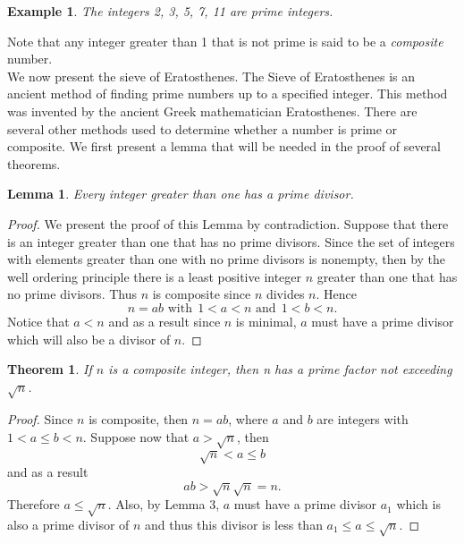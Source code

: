 \documentclass[12pt,letterpaper]{book}
\newtheorem{theorem}{Theorem}
\newtheorem{lemma}{Lemma}
\newtheorem{example}{Example}
\begin{document}
\begin{example}
The integers 2, 3, 5, 7, 11 are prime integers.
\end{example}

Note that any integer greater than 1 that is not prime is said to be a
\textit{composite} number.\\

We now present the sieve of Eratosthenes.  The Sieve of Eratosthenes is an ancient method of
finding prime numbers up to a specified integer.  This method was
invented by the ancient Greek mathematician Eratosthenes. There are
several other methods used to determine whether a number is prime or
composite. We first present a lemma that will be needed in the proof
of several theorems.

\begin{lemma}
Every integer greater than one has a prime divisor.
\end{lemma}

\begin{proof}
We present the proof of this Lemma by contradiction.  Suppose that
there is an integer greater than one that has no prime divisors.
Since the set of integers with elements greater than one with no
prime divisors is nonempty, then by the well ordering principle
there is a least positive integer $n$ greater than one that has no
prime divisors.  Thus $n$ is composite since $n$ divides $n$. Hence
\begin{equation*}
n=ab \mbox{ with}  \ \ 1<a<n \mbox{ and} \ \  1<b<n.
\end{equation*}
Notice that $a<n$ and as a result since $n$ is minimal, $a$ must
have a prime divisor which will also be a divisor of $n$.
\end{proof}

\begin{theorem}
If $n$ is a composite integer, then n has a prime factor not
exceeding $\sqrt{n}$.
\end{theorem}

\begin{proof}
Since $n$ is composite, then $n=ab$, where $a$ and $b$ are integers
with $1<a\leq b<n$.  Suppose now that $a>\sqrt{n}$, then
\begin{equation*}
\sqrt{n}<a \leq b
\end{equation*}
and as a result
\begin{equation*}
ab>\sqrt{n}\sqrt{n}=n.
\end{equation*}
Therefore $a\leq \sqrt{n}$. Also, by Lemma 3, $a$ must have a prime
divisor $a_1$ which is also a prime divisor of $n$ and thus this
divisor is less than $a_1 \leq a\leq \sqrt{n}$.
\end{proof}
\end{document}
